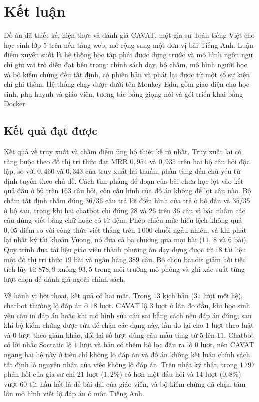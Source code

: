 \chapter*{Kết luận}
{}

Đồ án đã thiết kế, hiện thực và đánh giá CAVAT, một gia sư Toán tiếng Việt cho học sinh lớp 5 trên nền tảng web, mở rộng sang một đơn vị bài Tiếng Anh. Luận điểm xuyên suốt là hệ thống học tập phải được dựng trước và mô hình ngôn ngữ chỉ giữ vai trò diễn đạt bên trong: chính sách dạy, bộ chấm, mô hình người học và bộ kiểm chứng đều tất định, có phiên bản và phát lại được từ một sổ sự kiện chỉ ghi thêm. Hệ thống chạy được dưới tên Monkey Edu, gồm giao diện cho học sinh, phụ huynh và giáo viên, tương tác bằng giọng nói và gói triển khai bằng Docker.
 
\section*{Kết quả đạt được}
Kết quả về truy xuất và chấm điểm ủng hộ thiết kế rõ nhất. Truy xuất lai có ràng buộc theo đồ thị tri thức đạt MRR $0{,}954$ và $0{,}935$ trên hai bộ câu hỏi độc lập, so với $0{,}460$ và $0{,}343$ của truy xuất lai thuần, phần tăng đến chủ yếu từ định tuyến theo chủ đề. Cách tìm phẳng để đoạn của bài chưa học lọt vào kết quả đầu ở $56$ trên $163$ câu hỏi, còn cấu hình của đồ án không để lọt câu nào. Bộ chấm tất định chấm đúng $36/36$ câu trả lời điển hình của trẻ ở bộ đầu và $35/35$ ở bộ sau, trong khi hai chatbot chỉ đúng $28$ và $26$ trên $36$ câu vì bác nhầm các câu đúng viết bằng chữ hoặc có từ đệm. Phép chiếu mức hiểu lệch không quá $0{,}05$ điểm so với công thức viết thẳng trên $1\,000$ chuỗi ngẫu nhiên, và khi phát lại nhật ký tài khoản Vuong, nó đưa cả ba chương qua mọi bài ($11$, $8$ và $6$ bài). Quy trình đưa tài liệu giáo viên thành phương án dạy dựng được từ $18$ tài liệu một đồ thị tri thức $19$ bài và ngân hàng $389$ câu. Bộ chọn bandit giảm hối tiếc tích lũy từ $878{,}9$ xuống $93{,}5$ trong môi trường mô phỏng và ghi xác suất từng lượt chọn để đánh giá ngoài chính sách.

Về hành vi hội thoại, kết quả có hai mặt. Trong $13$ kịch bản ($31$ lượt mỗi hệ), chatbot thường lộ đáp án ở $18$ lượt. CAVAT lộ $3$ lượt ở lần đo đầu, khi học sinh yêu cầu in đáp án hoặc khi mô hình sửa câu sai bằng cách nêu đáp án đúng; sau khi bộ kiểm chứng được sửa để chặn các dạng này, lần đo lại cho $1$ lượt theo luật và $0$ lượt theo giám khảo, đổi lại số lượt dùng câu mẫu tăng từ $5$ lên $11$. Chatbot có lời nhắc Socratic lộ $1$ lượt và bản có thêm bộ lọc đầu ra lộ $0$ lượt, nên CAVAT ngang hai hệ này ở tiêu chí không lộ đáp án và đồ án không kết luận chính sách tất định là nguyên nhân của việc không lộ đáp án. Trên nhật ký thật, trong $1\,797$ phản hồi của gia sư chỉ $21$ lượt ($1{,}2\%$) có hơn một dấu hỏi và $14$ lượt ($0{,}8\%$) vượt $60$ từ, hầu hết là đề bài dài của giáo viên, và bộ kiểm chứng đã chặn tám lần mô hình viết lộ đáp án ở môn Tiếng Anh.

